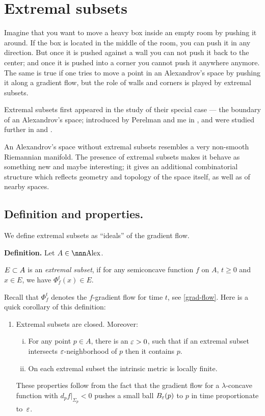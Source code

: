 \documentclass{article}
\begin{document}
\section{Extremal subsets}\label{extremal}

Imagine that you want to move a heavy box inside an empty room by pushing it around. 
If the box is located in the middle of the room, you  can push it in any direction. 
But once it is pushed against a wall you can not push it back to the center;
and once it is pushed into a corner you cannot push it anywhere anymore. 
The same is true if one tries to move a point in an Alexandrov's space by pushing
it along a gradient flow, but the role of walls and corners is played by  extremal
subsets.

Extremal subsets first appeared in the study of their special case --- the boundary of
an Alexandrov's space; 
introduced by Perelman and me in \cite{perelman-petrunin:extremal}, 
and
were studied further in \cite{petrunin:extremal}
and \cite{perelman:collapsing}.

An Alexandrov's space without extremal subsets resembles a very non-smooth Riemannian manifold.
The presence of extremal subsets makes it behave as something new and maybe
interesting; it gives an additional combinatorial structure which
reflects geometry and topology of the space itself, as well as of nearby spaces.








\subsection{Definition and properties.}

We define extremal subsets as ``ideals'' of the gradient flow. 

\begin{thm}{\bf Definition.}\label{def:extrim} Let $A\in \Alex$.

$E\subset A$ is an \emph{extremal subset}, if for any semiconcave function
$f$ on $A$, $t\ge 0$ and $x\in E$, we have $\Phi_f^t(x)\in E$.
\end{thm}

Recall that $\Phi^t_f$ denotes the $f$-gradient flow for time $t$, see
\ref{grad-flow}.
Here is a quick corollary of this definition:
\begin{enumerate}
\item Extremal subsets are closed. Moreover:
\begin{enumerate}[(i)]
\item For any point $p\in A$, there is an $\varepsilon>0$, such that if an extremal subset
intersects $\varepsilon$-neighborhood of $p$ then it contains $p$.

\item On each extremal subset the intrinsic metric is locally finite.
\end{enumerate}
\setcounter{extr-prop}{\value{enumi}}
These properties follow from the fact that the gradient flow for a $\lambda$-concave
function with $d_p f|_{\Sigma_p}<0$ pushes a small ball $B_\varepsilon(p)$ to $p$ in time
proportionate to~$\varepsilon$.
\end{enumerate}
\end{document}
